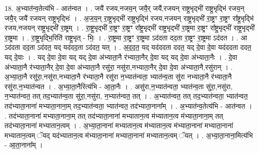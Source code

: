 \documentclass[17pt]{extarticle}
\begin{document}
18. अ॒भ्यात॑न्व॒तेत्य॑भि - आत॑न्वत । . जयै॑ रजय,नजय॒न् जयै॒र् जयै॑,रजयन् राष्ट्र॒भृद्भी॑ राष्ट्र॒भृद्भि॑ रजय॒न् जयै॒र् जयै॑ रजयन् राष्ट्र॒भृद्भिः॑ । . अ॒ज॒य॒न् रा॒ष्ट्र॒भृद्भी॑ राष्ट्र॒भृद्भि॑ रजय,नजयन् राष्ट्र॒भृद्भी॑ रा॒ष्ट्रꣳ रा॒ष्ट्रꣳ 
रा᳚ष्ट्र॒भृद्भि॑ रजय,नजयन् राष्ट्र॒भृद्भी॑ रा॒ष्ट्रम् । . रा॒ष्ट्र॒भृद्भी॑ रा॒ष्ट्रꣳ रा॒ष्ट्रꣳ रा᳚ष्ट्र॒भृद्भी॑ राष्ट्र॒भृद्भी॑ रा॒ष्ट्रमा रा॒ष्ट्रꣳ 
रा᳚ष्ट्र॒भृद्भी॑ राष्ट्र॒भृद्भी॑ रा॒ष्ट्रमा । . रा॒ष्ट्र॒भृद्भि॒रिति॑ राष्ट्र॒भृत् - भिः॒ । . रा॒ष्ट्रमा रा॒ष्ट्रꣳ रा॒ष्ट्रमा ऽद॑दता दद॒ता रा॒ष्ट्रꣳ रा॒ष्ट्रमा ऽद॑दत । . आ ऽद॑दता दद॒ता ऽद॑दत॒ यद् यद॑दद॒ता ऽद॑दत॒ यत् । . अ॒द॒द॒त॒ यद् यद॑ददता ददत॒ यद् दे॒वा दे॒वा यद॑ददता ददत॒ यद् दे॒वाः । . यद् दे॒वा दे॒वा यद् यद् दे॒वा अ॑भ्याता॒नै र॑भ्याता॒नैर् दे॒वा यद् यद् दे॒वा अ॑भ्याता॒नैः । . दे॒वा अ॑भ्याता॒नै र॑भ्याता॒नैर् दे॒वा दे॒वा अ॑भ्याता॒नै रसु॑रा॒ नसु॑रा,नभ्याता॒नैर् दे॒वा दे॒वा अ॑भ्याता॒नै,रसु॑रान् । . अ॒भ्या॒ता॒नै रसु॑रा॒,नसु॑रा,नभ्याता॒नै र॑भ्याता॒नै रसु॑रा न॒भ्यात॑न्वता॒ भ्यात॑न्व॒ता सु॑रा नभ्याता॒नै र॑भ्याता॒नै रसु॑रा,न॒भ्यात॑न्वत । . अ॒भ्या॒ता॒नैरित्य॑भि - आ॒ता॒नैः । . असु॑रा,न॒भ्यात॑न्वता॒ भ्यात॑न्व॒ता सु॑रा॒,नसु॑रा, न॒भ्यात॑न्वत॒ तत् तद॒भ्यात॑न्व॒ता सु॑रा॒,नसु॑रा, न॒भ्यात॑न्वत॒ तत् । . अ॒भ्यात॑न्वत॒ तत् तद॒भ्यात॑न्वता॒ भ्यात॑न्वत॒ तद॑भ्याता॒नाना॑ मभ्याता॒नाना॒म् तद॒भ्यात॑न्वता॒ भ्यात॑न्वत॒ तद॑भ्याता॒नाना᳚म् । . अ॒भ्यात॑न्व॒तेत्य॑भि - आत॑न्वत । . तद॑भ्याता॒नाना॑ मभ्याता॒नाना॒म् तत् तद॑भ्याता॒नाना॑ मभ्यातान॒त्व म॑भ्यातान॒त्व म॑भ्याता॒नाना॒म् तत् 
तद॑भ्याता॒नाना॑ मभ्यातान॒त्वम् । . अ॒भ्या॒ता॒नाना॑ मभ्यातान॒त्व म॑भ्यातान॒त्व म॑भ्याता॒नाना॑ मभ्याता॒नाना॑ मभ्यातान॒त्वम् ॅयद् यद॑भ्यातान॒त्व म॑भ्याता॒नाना॑ मभ्याता॒नाना॑ मभ्यातान॒त्वम् ॅयत् । . अ॒भ्या॒ता॒नाना॒मित्य॑भि - आ॒ता॒नाना᳚म् । \newline
\end{document}
